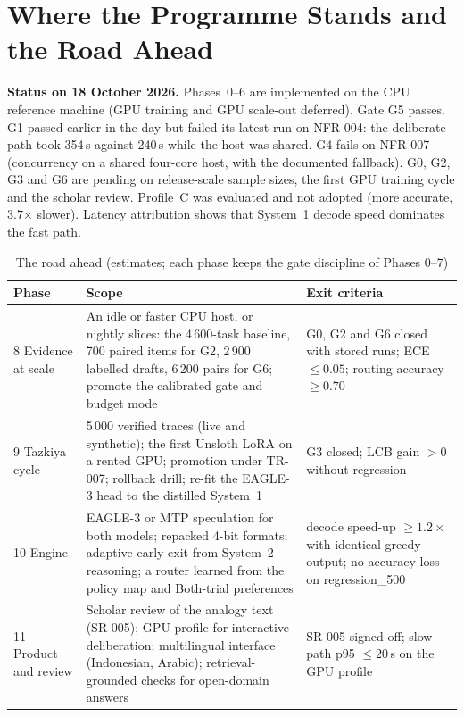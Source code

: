 \documentclass[11pt,a4paper]{article}
\begin{document}
\section{Where the Programme Stands and the Road Ahead}
\label{sec:ahead}
\textbf{Status on 18 October 2026.} Phases~0--6 are implemented on the CPU reference machine (GPU training and GPU scale-out deferred). Gate G5 passes. G1 passed earlier in the day but failed its latest run on NFR-004: the deliberate path took 354\,s against 240\,s while the host was shared. G4 fails on NFR-007 (concurrency on a shared four-core host, with the documented fallback). G0, G2, G3 and G6 are pending on release-scale sample sizes, the first GPU training cycle and the scholar review. Profile~C was evaluated and not adopted (more accurate, 3.7$\times$ slower). Latency attribution shows that System~1 decode speed dominates the fast path.

\begin{table}[h]\centering\small\caption{The road ahead (estimates; each phase keeps the gate discipline of Phases 0--7)}
\begin{tabular}{@{}p{2.6cm}p{6.3cm}p{6.2cm}@{}}\toprule Phase & Scope & Exit criteria\\\midrule
8 Evidence at scale & An idle or faster CPU host, or nightly slices: the 4\,600-task baseline, 700 paired items for G2, 2\,900 labelled drafts, 6\,200 pairs for G6; promote the calibrated gate and budget mode & G0, G2 and G6 closed with stored runs; ECE $\le0.05$; routing accuracy $\ge0.70$\\
9 Tazkiya cycle & 5\,000 verified traces (live and synthetic); the first Unsloth LoRA on a rented GPU; promotion under TR-007; rollback drill; re-fit the EAGLE-3 head to the distilled System~1 & G3 closed; LCB gain $>0$ without regression\\
10 Engine & EAGLE-3 or MTP speculation for both models; repacked 4-bit formats; adaptive early exit from System~2 reasoning; a router learned from the policy map and Both-trial preferences & decode speed-up $\ge1.2\times$ with identical greedy output; no accuracy loss on regression\_500\\
11 Product and review & Scholar review of the analogy text (SR-005); GPU profile for interactive deliberation; multilingual interface (Indonesian, Arabic); retrieval-grounded checks for open-domain answers & SR-005 signed off; slow-path p95 $\le20$\,s on the GPU profile\\
\bottomrule\end{tabular}\end{table}
\end{document}
